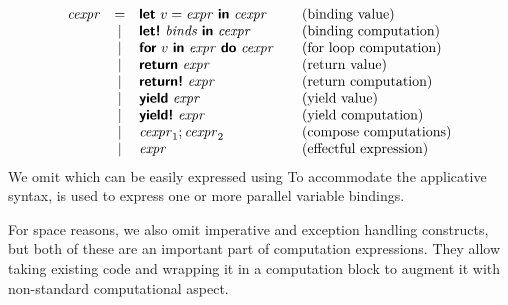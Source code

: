 \documentclass[runningheads,a4paper]{llncs}
\begin{document}
\begin{equation*}
\begin{array}{lclcl}
\cexpr &=& \kvd{let}~v=\expr~\kvd{in}~\cexpr                &&\textnormal{(binding value)} \\
       &|& \kvd{let!}~\binds~\kvd{in}~\cexpr                &&\textnormal{(binding computation)} \\
       &|& \kvd{for}~v~\kvd{in}~\expr~\kvd{do}~\cexpr       &&\textnormal{(for loop computation)} \\
       &|& \kvd{return}~\expr                               &&\textnormal{(return value)} \\
       &|& \kvd{return!}~\expr                              &&\textnormal{(return computation)} \\
       &|& \kvd{yield}~\expr                                &&\textnormal{(yield value)} \\
       &|& \kvd{yield!}~\expr                               &&\textnormal{(yield computation)} \\
       &|& \cexpr_1; \cexpr_2                               &&\textnormal{(compose computations)} \\       
       &|& \expr                                            &&\textnormal{(effectful expression)} \\
\end{array}
\end{equation*}
%
We omit  which can be easily expressed using  To accommodate the applicative 
syntax, \binds\; is used to express one or more parallel variable bindings. 

For space reasons, we also omit imperative  and exception handling 
constructs, but both of these are an important part of computation expressions. They allow
taking existing code and wrapping it in a computation block to augment it with non-standard
computational aspect.

\end{document}
